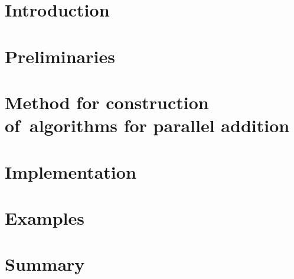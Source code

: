 \documentclass[a4paper, 11pt]{report}
\theoremstyle{plain}
\theoremstyle{definition}
\begin{document}

\chapter*{Introduction}


\chapter{Preliminaries}




\chapter{Method for construction of~algorithms for parallel addition}



\chapter{Implementation}

\chapter{Examples}


\chapter*{Summary}



\newpage
% 


\end{document}
